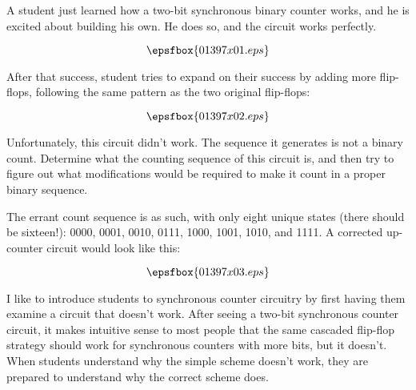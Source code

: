 

A student just learned how a two-bit synchronous binary counter works, and he is excited about building his own.  He does so, and the circuit works perfectly.

$$\epsfbox{01397x01.eps}$$

After that success, student tries to expand on their success by adding more flip-flops, following the same pattern as the two original flip-flops:

$$\epsfbox{01397x02.eps}$$

Unfortunately, this circuit didn't work.  The sequence it generates is not a binary count.  Determine what the counting sequence of this circuit is, and then try to figure out what modifications would be required to make it count in a proper binary sequence.







The errant count sequence is as such, with only eight unique states (there should be sixteen!): 0000, 0001, 0010, 0111, 1000, 1001, 1010, and 1111.  A corrected up-counter circuit would look like this:

$$\epsfbox{01397x03.eps}$$







I like to introduce students to synchronous counter circuitry by first having them examine a circuit that doesn't work.  After seeing a two-bit synchronous counter circuit, it makes intuitive sense to most people that the same cascaded flip-flop strategy should work for synchronous counters with more bits, but it doesn't.  When students understand why the simple scheme doesn't work, they are prepared to understand why the correct scheme does.




